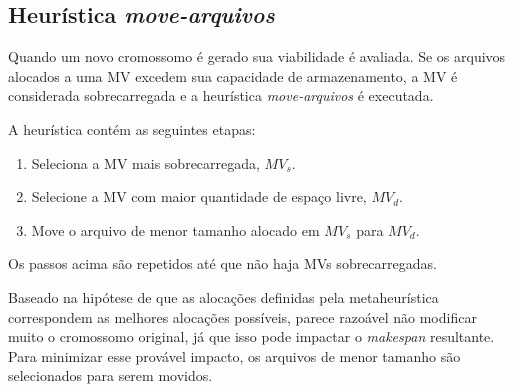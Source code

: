 \subsection{Heurística \textit{move-arquivos}} \label{ssec:heuristic}

Quando um novo cromossomo é gerado sua viabilidade é avaliada. Se os arquivos alocados a uma MV excedem sua capacidade de armazenamento, a MV é considerada sobrecarregada e a heurística \textit{move-arquivos} é executada.


A heurística contém as seguintes etapas:
\begin{enumerate}
\item Seleciona a MV mais sobrecarregada, $MV_s$.
\item Selecione a MV com maior quantidade de espaço livre, $MV_d$.
\item Move o arquivo de menor tamanho alocado em $MV_s$ para $MV_d$.
\end{enumerate}


Os passos acima são repetidos até que não haja MVs sobrecarregadas.


Baseado na hipótese de que as alocações definidas pela metaheurística correspondem as melhores alocações possíveis, parece razoável não modificar muito o cromossomo original, já que isso pode impactar o \textit{makespan} resultante. Para minimizar esse provável impacto, os arquivos de menor tamanho são selecionados para serem movidos.


